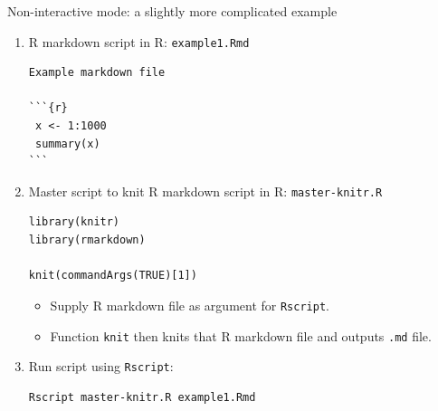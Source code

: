 \documentclass[12pt,t,xcolor=table]{beamer}
\begin{document}
\begin{frame}[fragile,label={sec:orgheadline14}]{Non-interactive mode: a slightly more complicated example}
 \begin{enumerate}
\item R markdown script in R: \texttt{example1.Rmd}

\begin{verbatim}
Example markdown file

```{r}
 x <- 1:1000
 summary(x)
```
\end{verbatim}

\item Master script to knit R markdown script in R: \texttt{master-knitr.R}

\begin{verbatim}
library(knitr)
library(rmarkdown)

knit(commandArgs(TRUE)[1])
\end{verbatim}

\begin{itemize}
\item Supply R markdown file as argument for \texttt{Rscript}.

\item Function \texttt{knit} then knits that R markdown file and outputs \texttt{.md} file.
\end{itemize}

\item Run script using \texttt{Rscript}:

\begin{verbatim}
Rscript master-knitr.R example1.Rmd
\end{verbatim}
\end{enumerate}
\end{frame}
\end{document}
